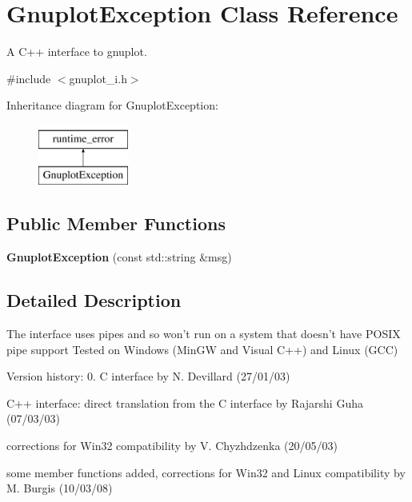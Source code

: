 \hypertarget{class_gnuplot_exception}{\section{Gnuplot\-Exception Class Reference}
\label{class_gnuplot_exception}
}


A C++ interface to gnuplot.  




{\ttfamily \#include $<$gnuplot\-\_\-i.\-h$>$}

Inheritance diagram for Gnuplot\-Exception\-:\begin{figure}[H]
\begin{center}
\leavevmode
\includegraphics[height=2.000000cm]{class_gnuplot_exception}
\end{center}
\end{figure}
\subsection*{Public Member Functions}
\begin{DoxyCompactItemize}
\item 
\hypertarget{class_gnuplot_exception_a8b324a9ef4d3f75079d41ecd61c62d44}{{\bfseries Gnuplot\-Exception} (const std\-::string \&msg)}\label{class_gnuplot_exception_a8b324a9ef4d3f75079d41ecd61c62d44}

\end{DoxyCompactItemize}


\subsection{Detailed Description}
The interface uses pipes and so won't run on a system that doesn't have P\-O\-S\-I\-X pipe support Tested on Windows (Min\-G\-W and Visual C++) and Linux (G\-C\-C)

Version history\-: 0. C interface by N. Devillard (27/01/03)
\begin{DoxyEnumerate}
\item C++ interface\-: direct translation from the C interface by Rajarshi Guha (07/03/03)
\item corrections for Win32 compatibility by V. Chyzhdzenka (20/05/03)
\item some member functions added, corrections for Win32 and Linux compatibility by M. Burgis (10/03/08)
\end{DoxyEnumerate}


